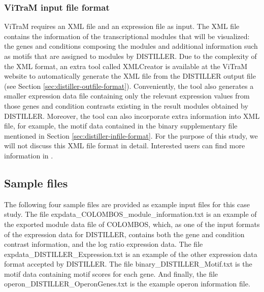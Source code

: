 \subsubsection{ViTraM input file format}
ViTraM requires an XML file and an expression file as input. The XML file
contains the information of the transcriptional modules that will be visualized:
the genes and conditions composing the modules and additional information such
as motifs that are assigned to modules by DISTILLER. Due to the complexity of
the XML format, an extra tool called XMLCreator is available at the ViTraM
website to automatically generate the XML file from the DISTILLER output file
(see Section \ref{sec:distiller-outfile-format}).  Conveniently, the tool also
generates a smaller expression data file containing only the relevant expression
values from those genes and condition contrasts existing in the result modules
obtained by DISTILLER.  Moreover, the tool can also incorporate extra
information into XML file, for example, the motif data contained in the binary
supplementary file mentioned in Section \ref{sec:distiller-infile-format}.
%
For the purpose of this study, we will not discuss this XML file format in
detail.  Interested users can find more information in \cite{Sun2009}.

%
%
%
%






\subsection{Sample files}\label{sec:dist-sample}

The following four sample files are provided as example input files for this 
case study. The file expdata\_COLOMBOS\_module\_information.txt is an example 
of the exported module data file of COLOMBOS, which, as one of the input 
formats of the expression data for DISTILLER, contains both the gene and 
condition contrast information, and the log ratio expression data. The file 
expdata\_DISTILLER\_Expression.txt is an example of the other expression data
format accepted by DISTILLER. The file binary\_DISTILLER\_Motif.txt is the motif
data containing motif scores for each gene. And finally, the file 
operon\_DISTILLER\_OperonGenes.txt is the example operon information file.

